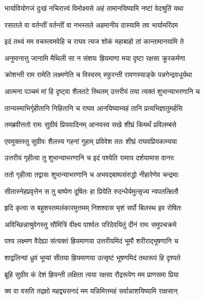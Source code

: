 \twolineshloka
{भार्यावियोगजं दुःखं नचिरात्त्वं विमोक्ष्यसे}
{अहं तामानयिष्यामि नष्टां वेदश्रुतिं यथा} %

\twolineshloka
{रसातले वा वर्तन्तीं वर्तन्तीं वा नभस्तले}
{अहमानीय दास्यामि तव भार्यामरिंदम} %

\twolineshloka
{इदं तथ्यं मम वचस्त्वमवेहि च राघव}
{त्यज शोकं महाबाहो तां कान्तामानयामि ते} %

\twolineshloka
{अनुमानात्तु जानामि मैथिली सा न संशयः}
{ह्रियमाणा मया दृष्टा रक्षसा क्रूरकर्मणा} %

\twolineshloka
{क्रोशन्ती राम रामेति लक्ष्मणेति च विस्वरम्}
{स्फुरन्ती रावणस्याङ्के पन्नगेन्द्रवधूर्यथा} %

\twolineshloka
{आत्मना पञ्चमं मां हि दृष्ट्वा शैलतटे स्थितम्}
{उत्तरीयं तया त्यक्तं शुभान्याभरणानि च} %

\twolineshloka
{तान्यस्माभिर्गृहीतानि निहितानि च राघव}
{आनयिष्याम्यहं तानि प्रत्यभिज्ञातुमर्हसि} %

\twolineshloka
{तमब्रवीत्ततो रामः सुग्रीवं प्रियवादिनम्}
{आनयस्व सखे शीघ्रं किमर्थं प्रविलम्बसे} %

\twolineshloka
{एवमुक्तस्तु सुग्रीवः शैलस्य गहनां गुहाम्}
{प्रविवेश ततः शीघ्रं राघवप्रियकाम्यया} %

\twolineshloka
{उत्तरीयं गृहीत्वा तु शुभान्याभरणानि च}
{इदं पश्येति रामाय दर्शयामास वानरः} %

\twolineshloka
{ततो गृहीत्वा तद्वासः शुभान्याभरणानि च}
{अभवद्बाष्पसंरुद्धो नीहारेणेव चन्द्रमाः} %

\twolineshloka
{सीतास्नेहप्रवृत्तेन स तु बाष्पेण दूषितः}
{हा प्रियेति रुदन्धैर्यमुत्सृज्य न्यपतत्क्षितौ} %

\twolineshloka
{हृदि कृत्वा स बहुशस्तमलंकारमुत्तमम्}
{निशश्वास भृशं सर्पो बिलस्थ इव रोषितः} %

\twolineshloka
{अविच्छिन्नाश्रुवेगस्तु सौमित्रिं वीक्ष्य पार्श्वतः}
{परिदेवयितुं दीनं रामः समुपचक्रमे} %

\twolineshloka
{पश्य लक्ष्मण वैदेह्या संत्यक्तं ह्रियमाणया}
{उत्तरीयमिदं भूमौ शरीराद्भूषणानि च} %

\twolineshloka
{शाद्वलिन्यां ध्रुवं भूम्यां सीतया ह्रियमाणया}
{उत्सृष्टं भूषणमिदं तथारूपं हि दृश्यते} %

\twolineshloka
{ब्रूहि सुग्रीव कं देशं ह्रियन्ती लक्षिता त्वया}
{रक्षसा रौद्ररूपेण मम प्राणसमा प्रिया} %

\twolineshloka
{क्व वा वसति तद्रक्षो महद्व्यसनदं मम}
{यन्निमित्तमहं सर्वान्नाशयिष्यामि राक्षसान्} %

